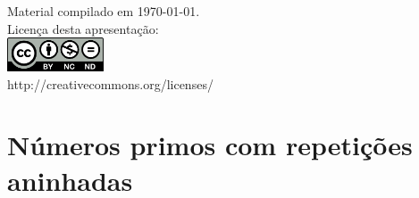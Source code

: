 \documentclass[portuguese,10pt,xcolor=table]{bredelebeamer}
\title{\insertlecture}
\author{Prof. Fernando Figueira\\(adaptado do material do Prof. Rafael Beserra Gomes)}
\institute{UFRN}
\date{}
\begin{document}
\begin{frame}
  \maketitle
 \begin{center}
 \tiny
Material compilado em \today.\\
  Licença desta apresentação:\\
		\includegraphics[height=1.0cm]{by-nc-nd.png}\\
http://creativecommons.org/licenses/
	\end{center}
\end{frame}


\def\WN[#1]{\cellcolor{white!40}#1}
\def\VN[#1]{\cellcolor{blue!40}#1}
\def\UN[#1]{\cellcolor{white}#1}
\def\ZN[#1]{\cellcolor{deepgreen!90}#1}
\def\RN[#1]{\cellcolor{red!40}#1}
\def\DRN[#1]{\cellcolor{deepred!90}#1}


\section{Números primos com repetições aninhadas}

	\begin{frame}[c]
		\begin{center}
			\structure{\large \insertsection}
		\end{center}
	\end{frame} 
	
\end{document}
